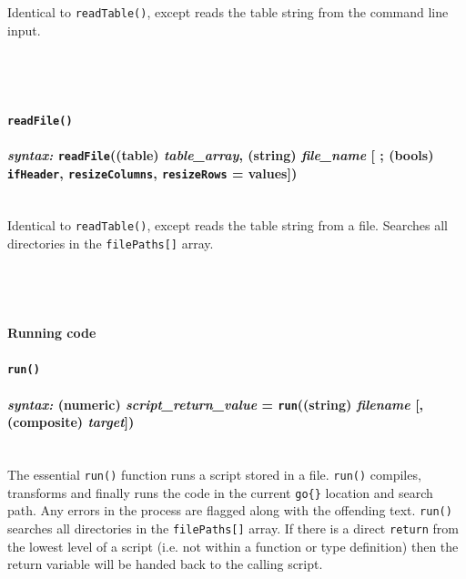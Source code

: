 \documentclass{article}
\begin{document}
Identical to \texttt{readTable()}, except reads the table string from the command line input.\\\\\\\\



\paragraph{\texttt{readFile()}\\\\
\normalfont \emph{syntax: } \texttt{readFile}((table) \emph{table\_array}, (string) \emph{file\_name} [ ; (bools) \texttt{ifHeader}, \texttt{resizeColumns}, \texttt{resizeRows} = values])\\\\}

Identical to \texttt{readTable()}, except reads the table string from a file.  Searches all directories in the \verb#filePaths[]# array.\\\\\\\\




\paragraph{Running code}


\paragraph{\texttt{run()}\\\\
\normalfont \emph{syntax: } (numeric) \emph{script\_return\_value} = \texttt{run}((string) \emph{filename} [, (composite) \emph{target}])\\\\}

The essential \texttt{run()} function runs a script stored in a file.  \texttt{run()} compiles, transforms and finally runs the code in the current \verb#go{}# location and search path.  Any errors in the process are flagged along with the offending text.  \texttt{run()} searches all directories in the \texttt{filePaths[]} array.  If there is a direct \verb#return# from the lowest level of a script (i.e. not within a function or type definition) then the return variable will be handed back to the calling script.
\end{document}

